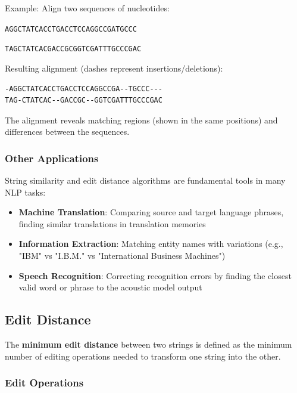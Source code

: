 \documentclass[11pt,a4paper]{article}
\theoremstyle{definition}
\theoremstyle{plain}
\theoremstyle{remark}
\begin{document}
Example: Align two sequences of nucleotides:

\texttt{AGGCTATCACCTGACCTCCAGGCCGATGCCC}

\texttt{TAGCTATCACGACCGCGGTCGATTTGCCCGAC}

Resulting alignment (dashes represent insertions/deletions):
\begin{verbatim}
-AGGCTATCACCTGACCTCCAGGCCGA--TGCCC---
TAG-CTATCAC--GACCGC--GGTCGATTTGCCCGAC
\end{verbatim}

The alignment reveals matching regions (shown in the same positions) and differences between the sequences.

\subsubsection{Other Applications}
String similarity and edit distance algorithms are fundamental tools in many NLP tasks:
\begin{itemize}
    \item \textbf{Machine Translation}: Comparing source and target language phrases, finding similar translations in translation memories
    \item \textbf{Information Extraction}: Matching entity names with variations (e.g., "IBM" vs "I.B.M." vs "International Business Machines")
    \item \textbf{Speech Recognition}: Correcting recognition errors by finding the closest valid word or phrase to the acoustic model output
\end{itemize}

\subsection{Edit Distance}

The \textbf{minimum edit distance} between two strings is defined as the minimum number of editing operations needed to transform one string into the other.

\subsubsection{Edit Operations}
\end{document}
